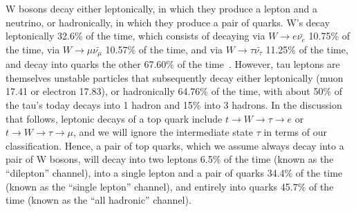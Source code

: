 W bosons decay either leptonically, in which they produce a lepton and a neutrino, or hadronically, in which they produce a pair of quarks.
W's decay leptonically 32.6\% of the time, which consists of decaying via $W \rightarrow e \bar{\nu_{e}}$ 10.75\% of the time, 
via $W \rightarrow \mu \bar{\nu_{\mu}}$ 10.57\% of the time, and via $W \rightarrow \tau \bar{\nu_{\tau}}$ 11.25\% of the time, 
and decay into quarks the other 67.60\% of the time~\cite{PARTICLE_DATA_GROUP}.
However, tau leptons are themselves unstable particles that subsequently decay either leptonically (muon 17.41 or electron 17.83), or hadronically 64.76\% of the time, with about 50\% of the tau's today decays into 1 hadron and 15\% into 3 hadrons.
In the discussion that follows, leptonic decays of a top quark include $t \rightarrow W \rightarrow \tau \rightarrow e$ or $t \rightarrow W \rightarrow \tau \rightarrow \mu$, and we will ignore the intermediate state $\tau$ in terms of our classification.
Hence, a pair of top quarks, which we assume always decay into a pair of W bosons, will decay into two leptons 6.5\% of the time (known as the ``dilepton'' channel), into a single lepton and a pair of quarks 34.4\% of the time (known as the ``single lepton'' channel), and entirely into quarks 45.7\% of the time (known as the ``all hadronic'' channel).





